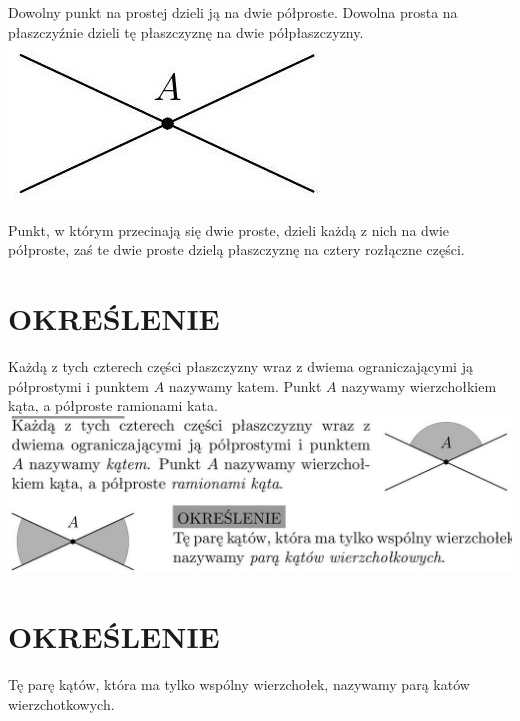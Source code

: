 \documentclass[10pt]{article}
\begin{document}
Dowolny punkt na prostej dzieli ją na dwie półproste. Dowolna prosta na płaszczyźnie dzieli tę płaszczyznę na dwie półpłaszczyzny.\\
\includegraphics[max width=\textwidth, center]{2024_11_21_8f01584889ff06348ae7g-186(2)}

Punkt, w którym przecinają się dwie proste, dzieli każdą z nich na dwie półproste, zaś te dwie proste dzielą płaszczyznę na cztery rozłączne części.

\section*{OKREŚLENIE}
Każdą z tych czterech części płaszczyzny wraz z dwiema ograniczającymi ją półprostymi i punktem \(A\) nazywamy katem. Punkt \(A\) nazywamy wierzchołkiem kąta, a półproste ramionami kata.\\
\includegraphics[max width=\textwidth, center]{2024_11_21_8f01584889ff06348ae7g-186(4)}

\section*{OKREŚLENIE}
Tę parę kątów, która ma tylko wspólny wierzchołek, nazywamy parą katów wierzchotkowych.
\end{document}
